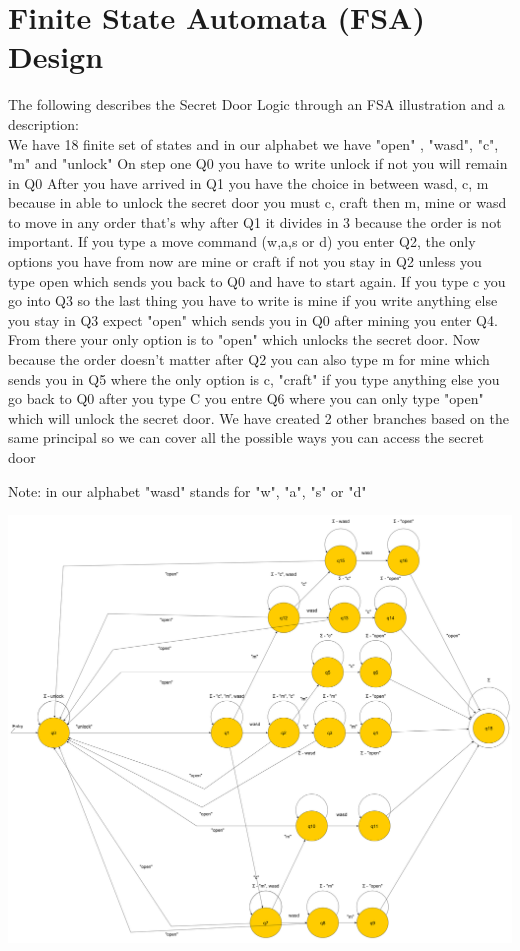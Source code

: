 \section{Finite State Automata (FSA) Design} \label{section: fsa design}
The following describes the Secret Door Logic through an FSA illustration and a description: \\

We have 18 finite set of states and in our alphabet we have "open" , "wasd", "c", "m" and "unlock" 
On step one Q0 you have to write unlock if not you will remain in Q0
After you have arrived in Q1 you have the choice in between wasd, c, m because in able to unlock the secret door you must c, craft then m, mine or wasd to move in any order that's why after Q1 it divides in 3 because the order is not important.
If you type a move command (w,a,s or d) you enter Q2, the only options you have from now are mine or craft if not you stay in Q2 unless you type open which sends you back to Q0 and have to start again. If you type c you go into Q3 so the last thing you have to write is mine if you write anything else you stay in Q3 expect "open" which sends you in Q0 after mining you enter Q4. From there your only option is to "open" which unlocks the secret door.
Now because the order doesn't matter after Q2  you can also type m for mine which sends you in Q5 where the only option is c, "craft" if you type anything else you go back to Q0 after you type C you entre Q6 where you can only type "open" which will unlock the secret door.
We have created 2 other branches based on the same principal so we can cover all the possible ways you can access the secret door

Note: in our alphabet "wasd" stands for "w", "a", "s" or "d" 

{\includegraphics[width=\textwidth,height=\textheight,keepaspectratio]{../dfa.png}}
